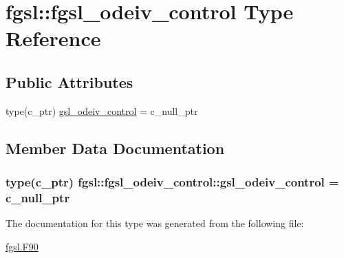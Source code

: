 \hypertarget{structfgsl_1_1fgsl__odeiv__control}{}\section{fgsl\+:\+:fgsl\+\_\+odeiv\+\_\+control Type Reference}
\label{structfgsl_1_1fgsl__odeiv__control}
\subsection*{Public Attributes}
\begin{DoxyCompactItemize}
\item 
type(c\+\_\+ptr) \hyperlink{structfgsl_1_1fgsl__odeiv__control_a1c25e770ecfccfaa80cc8edd0a9b462d}{gsl\+\_\+odeiv\+\_\+control} = c\+\_\+null\+\_\+ptr
\end{DoxyCompactItemize}


\subsection{Member Data Documentation}
\hypertarget{structfgsl_1_1fgsl__odeiv__control_a1c25e770ecfccfaa80cc8edd0a9b462d}{}
\subsubsection[{gsl\+\_\+odeiv\+\_\+control}]{\setlength{\rightskip}{0pt plus 5cm}type(c\+\_\+ptr) fgsl\+::fgsl\+\_\+odeiv\+\_\+control\+::gsl\+\_\+odeiv\+\_\+control = c\+\_\+null\+\_\+ptr}\label{structfgsl_1_1fgsl__odeiv__control_a1c25e770ecfccfaa80cc8edd0a9b462d}


The documentation for this type was generated from the following file\+:\begin{DoxyCompactItemize}
\item 
\hyperlink{fgsl_8F90}{fgsl.\+F90}\end{DoxyCompactItemize}
